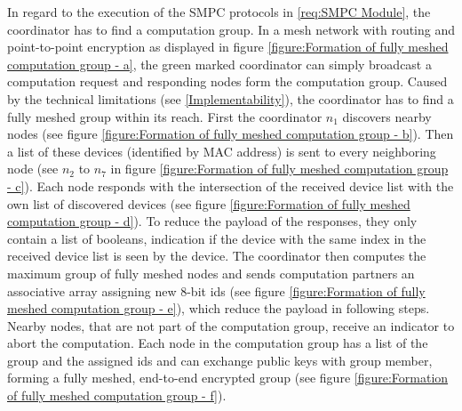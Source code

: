 		In regard to the execution of the \gls{SMPC} protocols in \ref{req:SMPC Module}, the coordinator has to find a computation group. In a mesh network with routing and point-to-point encryption as displayed in figure \ref{figure:Formation of fully meshed computation group - a}, the green marked coordinator can simply broadcast a computation request and responding nodes form the computation group. Caused by the technical limitations (see \ref{Implementability}), the coordinator has to find a fully meshed group within its reach. First the coordinator $n_1$ discovers nearby nodes (see figure \ref{figure:Formation of fully meshed computation group - b}). Then a list of these devices (identified by \gls{MAC} address) is sent to every neighboring node (see $n_2$ to $n_7$ in figure \ref{figure:Formation of fully meshed computation group - c}). Each node responds with the intersection of the received device list with the own list of discovered devices (see figure \ref{figure:Formation of fully meshed computation group - d}). To reduce the payload of the responses, they only contain a list of booleans, indication if the device with the same index in the received device list is seen by the device. The coordinator then computes the maximum group of fully meshed nodes and sends computation partners an associative array assigning new 8-bit ids (see figure \ref{figure:Formation of fully meshed computation group - e}), which reduce the payload in following steps. Nearby nodes, that are not part of the computation group, receive an indicator to abort the computation. Each node in the computation group has a list of the group and the assigned ids and can exchange public keys with group member, forming a fully meshed, end-to-end encrypted group (see figure \ref{figure:Formation of fully meshed computation group - f}).
		
